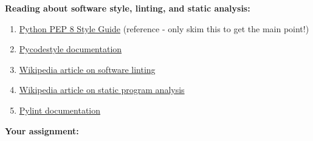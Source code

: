 \documentclass[10pt]{article}
\begin{document}
  \vspace{5mm}

\noindent
\textbf{Reading about software style, linting, and static analysis:}

\begin{enumerate}

\item \href{https://peps.python.org/pep-0008/}{Python PEP 8 Style
    Guide} (reference - only skim this to get the main point!)

\item \href{https://pypi.org/project/pycodestyle/}{Pycodestyle documentation}
  
\item \href{https://en.wikipedia.org/wiki/Lint_(software)}{Wikipedia
    article on software linting}

\item
  \href{https://en.wikipedia.org/wiki/Static_program_analysis}{Wikipedia
  article on static program analysis}

\item \href{https://pylint.readthedocs.io/en/latest/index.html}{Pylint
  documentation}

 \end{enumerate}


\vspace{5mm}

\noindent
\textbf{Your assignment:}  
\end{document}
